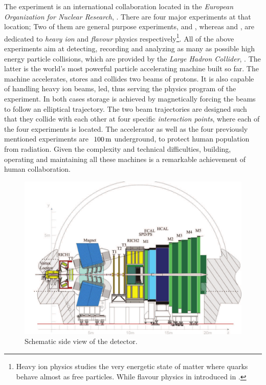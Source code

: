 
The \lhcb experiment is an international collaboration located in the {\it European Organization for Nuclear Research}, \cern.
There are four major experiments at that location; Two of them are general purpose experiments, \atlas and \cms, whereas
\alice and \lhcb, are dedicated to {\it heavy ion} and {\it flavour} physics respectively\footnote{Heavy ion physics
studies the very energetic state of matter where quarks behave almost as free particles. While flavour physics in introduced in .}.
All of the above experiments aim at detecting, recording and analyzing as many as
possible high energy particle collisions, which are provided by the {\it Large Hadron Collider}, \lhc.
The latter is the world's most powerful particle accelerating machine built so far.
The \lhc machine accelerates, stores and collides two beams of protons. It is also capable of handling
heavy ion beams, \eg led, thus serving the physics program of the \alice experiment.
In both cases storage is achieved by magnetically forcing the beams to follow an elliptical trajectory.
The two beam trajectories are designed such that they collide with each other at four specific {\it interaction points},
where each of the four experiments is located. The \lhc accelerator as well as the four previously
mentioned experiments are $~100\rm \,m$ underground, to protect human population from radiation.
Given the complexity and technical difficulties, building, operating and maintaining all these machines
is a remarkable achievement of human collaboration.

\begin{figure}[t]
  \centering
  \includegraphics[width=\textwidth]{Figures/Chapter2/detector_cross_cmyk}
  \caption{Schematic side view of the \lhcb detector.}
  \label{lhcb_detector_cross_section}
\end{figure}

